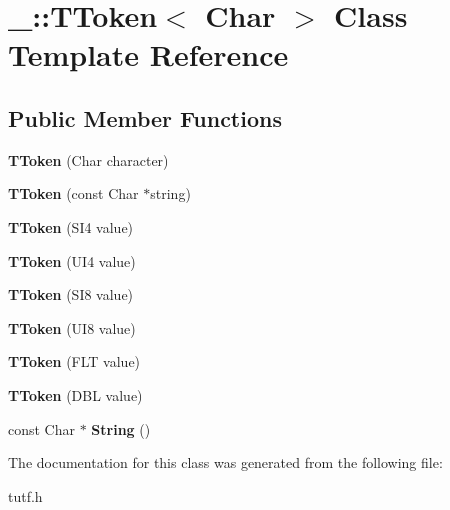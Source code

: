 \hypertarget{class___1_1_t_token}{}\section{\+\_\+\+:\+:T\+Token$<$ Char $>$ Class Template Reference}
\label{class___1_1_t_token}
\subsection*{Public Member Functions}
\begin{DoxyCompactItemize}
\item 
\mbox{\label{class___1_1_t_token_ab36c43426d58dbcf99b06cbcecb9e865}} 
{\bfseries T\+Token} (Char character)
\item 
\mbox{\label{class___1_1_t_token_a892291327a14acf940647ccc4f9c3deb}} 
{\bfseries T\+Token} (const Char $\ast$string)
\item 
\mbox{\label{class___1_1_t_token_ac04afba13e59924ba3b495f7e55d745b}} 
{\bfseries T\+Token} (S\+I4 value)
\item 
\mbox{\label{class___1_1_t_token_ab53f9e14329030b25fb33b5f84ac86a5}} 
{\bfseries T\+Token} (U\+I4 value)
\item 
\mbox{\label{class___1_1_t_token_a8e69167a25987ded5f50449edf4a14a1}} 
{\bfseries T\+Token} (S\+I8 value)
\item 
\mbox{\label{class___1_1_t_token_ab112e64da38e901b6485722f0cb9b110}} 
{\bfseries T\+Token} (U\+I8 value)
\item 
\mbox{\label{class___1_1_t_token_a6232132f448c83ad88ce06596f706700}} 
{\bfseries T\+Token} (F\+LT value)
\item 
\mbox{\label{class___1_1_t_token_aa28d470cb43aa224798cf5d1d66fdaf6}} 
{\bfseries T\+Token} (D\+BL value)
\item 
\mbox{\label{class___1_1_t_token_ae396613d61c83b9643a880bb91c649ab}} 
const Char $\ast$ {\bfseries String} ()
\end{DoxyCompactItemize}


The documentation for this class was generated from the following file\+:\begin{DoxyCompactItemize}
\item 
tutf.\+h\end{DoxyCompactItemize}
